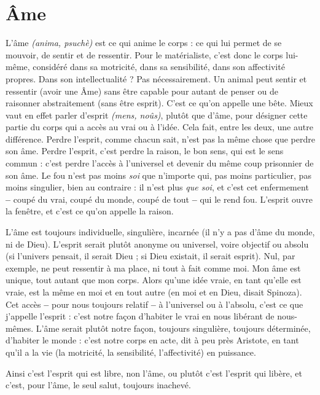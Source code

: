 \section{Âme}
L'âme {\it (anima, psuchè)} est ce qui anime le corps : ce qui lui permet de se
mouvoir, de sentir et de ressentir. Pour le matérialiste, c’est donc le
corps lui-même, considéré dans sa motricité, dans sa sensibilité, dans son affectivité
propres. Dans son intellectualité ? Pas nécessairement. Un animal peut
sentir et ressentir (avoir une Âme) sans être capable pour autant de penser ou de
raisonner abstraitement (sans être esprit). C’est ce qu’on appelle une bête.
Mieux vaut en effet parler d'esprit {\it (mens, noûs)}, plutôt que d’âme, pour désigner
cette partie du corps qui a accès au vrai ou à l’idée. Cela fait, entre les
deux, une autre différence. Perdre l'esprit, comme chacun sait, n’est pas la
même chose que perdre son âme. Perdre l'esprit, c’est perdre la raison, le bon
sens, qui est le sens commun : c’est perdre l'accès à l’universel et devenir du
même coup prisonnier de son âme. Le fou n’est pas moins {\it soi} que n'importe
qui, pas moins particulier, pas moins singulier, bien au contraire : il n'est plus
{\it que soi}, et c’est cet enfermement {\bf --} coupé du vrai, coupé du monde, coupé de
tout {\bf --} qui le rend fou. L'esprit ouvre la fenêtre, et c’est ce qu’on appelle la
raison.

L'âme est toujours individuelle, singulière, incarnée (il n’y a pas d’âme du
monde, ni de Dieu). L'esprit serait plutôt anonyme ou universel, voire objectif
ou absolu (si l’univers pensait, il serait Dieu ; si Dieu existait, il serait esprit).
Nul, par exemple, ne peut ressentir à ma place, ni tout à fait comme moi. Mon
âme est unique, tout autant que mon corps. Alors qu’une idée vraie, en tant
qu’elle est vraie, est la même en moi et en tout autre (en moi et en Dieu, disait
Spinoza). Cet accès {\bf --} pour nous toujours relatif {\bf --} à l’universel ou à l'absolu,
c’est ce que j'appelle l'esprit : c’est notre façon d’habiter le vrai en nous libérant
de nous-mêmes. L'âme serait plutôt notre façon, toujours singulière, toujours
déterminée, d’habiter le monde : c’est notre corps en acte, dit à peu près Aristote,
en tant qu’il a la vie (la motricité, la sensibilité, l’affectivité) en puissance.

Ainsi c’est l'esprit qui est libre, non l’âme, ou plutôt c’est l'esprit qui libère,
et c’est, pour l’âme, le seul salut, toujours inachevé.

